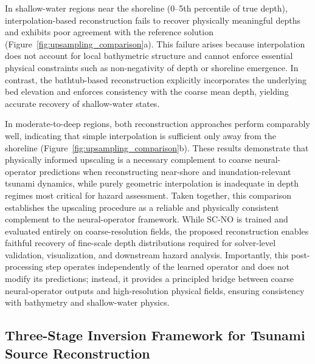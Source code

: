In shallow-water regions near the shoreline (0–5th percentile of true depth), interpolation-based reconstruction fails to recover physically meaningful depths and exhibits poor agreement with the reference solution (Figure~\ref{fig:upsampling_comparison}a). This failure arises because interpolation does not account for local bathymetric structure and cannot enforce essential physical constraints such as non-negativity of depth or shoreline emergence. In contrast, the bathtub-based reconstruction explicitly incorporates the underlying bed elevation and enforces consistency with the coarse mean depth, yielding accurate recovery of shallow-water states.

In moderate-to-deep regions, both reconstruction approaches perform comparably well, indicating that simple interpolation is sufficient only away from the shoreline (Figure~\ref{fig:upsampling_comparison}b). These results demonstrate that physically informed upscaling is a necessary complement to coarse neural-operator predictions when reconstructing near-shore and inundation-relevant tsunami dynamics, while purely geometric interpolation is inadequate in depth regimes most critical for hazard assessment.
Taken together, this comparison establishes the upscaling procedure as a reliable and physically consistent complement to the neural-operator framework. While SC-NO is trained and evaluated entirely on coarse-resolution fields, the proposed reconstruction enables faithful recovery of fine-scale depth distributions required for solver-level validation, visualization, and downstream hazard analysis. Importantly, this post-processing step operates independently of the learned operator and does not modify its predictions; instead, it provides a principled bridge between coarse neural-operator outputs and high-resolution physical fields, ensuring consistency with bathymetry and shallow-water physics.





\subsection*{Three-Stage Inversion Framework for Tsunami Source Reconstruction}
\label{sec:inversion_framework}

